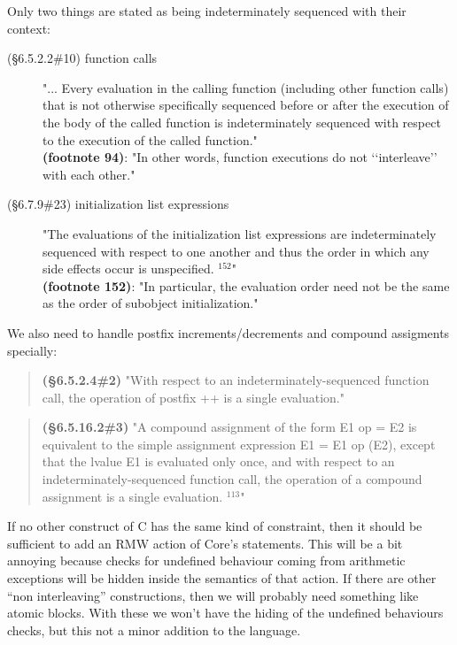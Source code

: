 \documentclass[12pt, a4paper]{article}
\newcommand{\csyn}[1]{#1} %
\begin{document}
Only two things are stated as being indeterminately sequenced with their context:
\begin{description}
\item[(§6.5.2.2\#10) function calls]
  "... Every evaluation in the calling function (including other function
  calls) that is not otherwise specifically sequenced before or after the
  execution of the body of the called function is indeterminately sequenced
  with respect to the execution of the called function."\\
  {\bf (footnote 94)}:
  "In other words, function executions do not ‘‘interleave’’ with each
  other."
  
\item[(§6.7.9\#23) initialization list expressions]
  "The evaluations of the initialization list expressions are
  indeterminately sequenced with respect to one another and thus the order
  in which any side effects occur is unspecified. ${}^{152}$"\\
  {\bf (footnote 152)}:
  "In particular, the evaluation order need not be the same as the order of
  subobject initialization."
\end{description}

We also need to handle postfix increments/decrements and compound assigments specially:
\begin{quote}
  {\bf (§6.5.2.4\#2)}
  "With respect to an indeterminately-sequenced function call, the operation
  of postfix ++ is a single evaluation."
\end{quote}

\begin{quote}
  {\bf (§6.5.16.2\#3)}
  "A compound assignment of the form \csyn{E1 op = E2} is equivalent to the simple
  assignment expression \csyn{E1 = E1 op (E2)}, except that the lvalue \csyn{E1} is
  evaluated only once, and with respect to an indeterminately-sequenced
  function call, the operation of a compound assignment is a single
  evaluation. ${}^{113}$"
\end{quote}


If no other construct of C has the same kind of constraint, then it should be sufficient to add an RMW action of Core's statements.
This will be a bit annoying because checks for undefined behaviour coming from arithmetic exceptions will be hidden inside the semantics
of that action.
If there are other ``non interleaving'' constructions, then we will probably need something like atomic blocks.
With these we won't have the hiding of the undefined behaviours checks, but this not a minor addition to the language.
\end{document}
